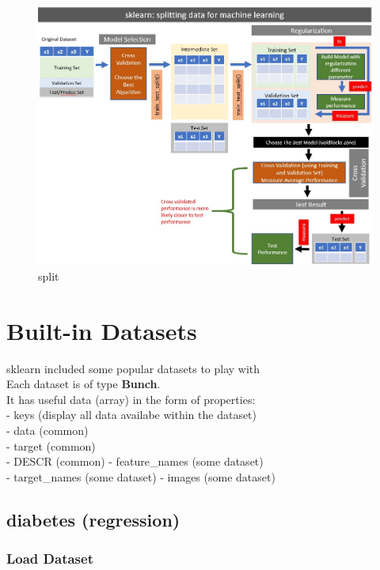\documentclass[
]{book}
\begin{document}
\begin{figure}
\centering
\includegraphics{img/scikit_learn_split.jpg}
\caption{split}
\end{figure}

\hypertarget{built-in-datasets}{%
\section{Built-in Datasets}\label{built-in-datasets}}

sklearn included some popular datasets to play with\\
Each dataset is of type \textbf{Bunch}.\\
It has useful data (array) in the form of properties:\\
- keys (display all data availabe within the dataset)\\
- data (common)\\
- target (common)\\
- DESCR (common) - feature\_names (some dataset)\\
- target\_names (some dataset) - images (some dataset)

\hypertarget{diabetes-regression}{%
\subsection{diabetes (regression)}\label{diabetes-regression}}

\hypertarget{load-dataset}{%
\subsubsection{Load Dataset}\label{load-dataset}}
\end{document}
